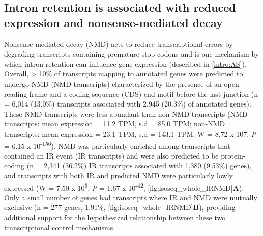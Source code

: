 \subsection{Intron retention is associated with reduced expression and nonsense-mediated decay}
\label{ch4: IR}
Nonsense-mediated decay (NMD) acts to reduce transcriptional errors by degrading transcripts containing premature stop codons\cite{Hug2015} and is one mechanism by which intron retention can influence gene expression\cite{Pan2006} (described in \cref{intro:AS}). Overall, > 10\% of transcripts mapping to annotated genes were predicted to undergo NMD (NMD transcripts) characterized by the presence of an open reading frame and a coding sequence (CDS) end motif before the last junction (n = 6,014 (13.0\%) transcripts associated with 2,945 (20.3\%) of annotated genes). These NMD transcripts were less abundant than non-NMD transcripts (NMD transcripts: mean expression = 11.2 TPM, s.d =  85.0 TPM; non-NMD transcripts: mean expression = 23.1 TPM, s.d = 143.1 TPM; W = 8.72 x 107, \textit{P} = 6.15 x 10\textsuperscript{-156}).  NMD was particularly enriched among transcripts that contained an IR event (IR transcripts) and were also predicted to be protein-coding (n = 2,341 (36.2\%) IR transcripts associated with 1,380 (9.53\%) genes), and transcripts with both IR and predicted NMD were particularly lowly expressed (W = 7.50 x 10\textsuperscript{6}, \textit{P} = 1.67 x 10\textsuperscript{-42}, \cref{fig:isoseq_whole_IRNMD}\textbf{A}). Only a small number of genes had transcripts where IR and NMD were mutually exclusive (n = 277 genes, 1.91\%,
\cref{fig:isoseq_whole_IRNMD}\textbf{B}), providing additional support for the hypothesized relationship between these two transcriptional control mechanisms\cite{Ge2014}. 


